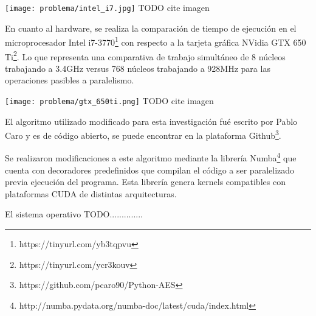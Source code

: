 \documentclass[../main.tex]{subfiles}
\begin{document}
  \texttt{[image: problema/intel\_i7.jpg]}
  TODO cite imagen

  En cuanto al hardware, se realiza la comparación de tiempo de ejecución en el microprocesador Intel i7-3770\footnote{https://tinyurl.com/yb3tqpvu} con respecto a la tarjeta gráfica NVidia GTX 650 Ti\footnote{https://tinyurl.com/ycr3kouv}. Lo que representa una comparativa de trabajo simultáneo de 8 núcleos trabajando a 3.4GHz versus 768 núcleos trabajando a 928MHz para las operaciones pasibles a paralelismo.

  \texttt{[image: problema/gtx\_650ti.png]}
  TODO cite imagen

  El algoritmo utilizado modificado para esta investigación fué escrito por Pablo Caro y es de código abierto, se puede encontrar en la plataforma Github\footnote{https://github.com/pcaro90/Python-AES}.

  Se realizaron modificaciones a este algoritmo mediante la librería Numba\footnote{http://numba.pydata.org/numba-doc/latest/cuda/index.html} que cuenta con decoradores predefinidos que compilan el código a ser paralelizado previa ejecución del programa. Esta librería genera kernels compatibles con plataformas CUDA de distintas arquitecturas.

  El sistema operativo TODO..............

  \bibliografia
\end{document}
